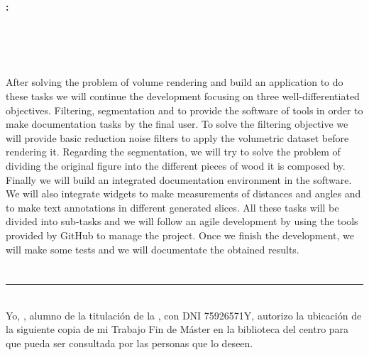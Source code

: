 \thispagestyle{empty}

\cleardoublepage

\begin{center}
	{\large\bfseries \myTitle: \myEnglishSubtitle}\\
\end{center}

\begin{center}
	\myName \\
\end{center}

\vspace{0.7cm}
\\

\vspace{0.7cm}
\\

After solving the problem of volume rendering and build an application to do these tasks we will continue the development focusing on three well-differentiated objectives. Filtering, segmentation and to provide the software of tools in order to make documentation tasks by the final user. To solve the filtering objective we will provide basic reduction noise filters to apply the volumetric dataset before rendering it. Regarding the segmentation, we will try to solve the problem of dividing the original figure into the different pieces of wood it is composed by. Finally we will build an integrated documentation environment in the software. We will also integrate widgets to make measurements of distances and angles and to make text annotations in different generated slices. All these tasks will be divided into sub-tasks and we will follow an agile development by using the tools provided by GitHub to manage the project. Once we finish the development, we will make some tests and we will documentate the obtained results.

\chapter*{}
\thispagestyle{empty}

\noindent\rule[-1ex]{\textwidth}{2pt}\\[4.5ex]

Yo, \textbf{\myName}, alumno de la titulación \myDegree de la \textbf{\myFaculty}, con DNI 75926571Y, autorizo la ubicación de la siguiente copia de mi Trabajo Fin de Máster en la biblioteca del centro para que pueda ser consultada por las personas que lo deseen.

